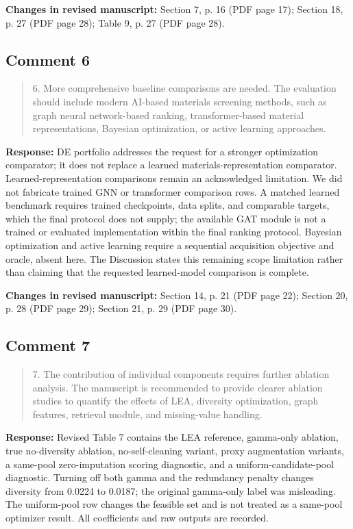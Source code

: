 \documentclass[11pt,a4paper]{article}
\begin{document}
\textbf{Changes in revised manuscript:} Section 7, p. 16 (PDF page 17); Section 18, p. 27 (PDF page 28); Table 9, p. 27 (PDF page 28).

\subsection*{Comment 6}
\begin{quote}\small 6. More comprehensive baseline comparisons are needed. The evaluation should include modern AI-based materials screening methods, such as graph neural network-based ranking, transformer-based material representations, Bayesian optimization, or active learning approaches.\end{quote}
\textbf{Response:} DE portfolio addresses the request for a stronger optimization comparator; it does not replace a learned materials-representation comparator. Learned-representation comparisons remain an acknowledged limitation. We did not fabricate trained GNN or transformer comparison rows. A matched learned benchmark requires trained checkpoints, data splits, and comparable targets, which the final protocol does not supply; the available GAT module is not a trained or evaluated implementation within the final ranking protocol. Bayesian optimization and active learning require a sequential acquisition objective and oracle, absent here. The Discussion states this remaining scope limitation rather than claiming that the requested learned-model comparison is complete.

\textbf{Changes in revised manuscript:} Section 14, p. 21 (PDF page 22); Section 20, p. 28 (PDF page 29); Section 21, p. 29 (PDF page 30).

\subsection*{Comment 7}
\begin{quote}\small 7. The contribution of individual components requires further ablation analysis. The manuscript is recommended to provide clearer ablation studies to quantify the effects of LEA, diversity optimization, graph features, retrieval module, and missing-value handling.\end{quote}
\textbf{Response:} Revised Table 7 contains the LEA reference, gamma-only ablation, true no-diversity ablation, no-self-cleaning variant, proxy augmentation variants, a same-pool zero-imputation scoring diagnostic, and a uniform-candidate-pool diagnostic. Turning off both gamma and the redundancy penalty changes diversity from 0.0224 to 0.0187; the original gamma-only label was misleading. The uniform-pool row changes the feasible set and is not treated as a same-pool optimizer result. All coefficients and raw outputs are recorded.
\end{document}
